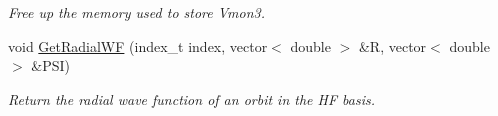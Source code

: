 \begin{DoxyCompactItemize}
\begin{DoxyCompactList}\small\item\em Free up the memory used to store Vmon3. \end{DoxyCompactList}\item 
void \hyperlink{classHartreeFock_a2bc07257af2fe0ca86e6a3f8c642c3c6}{Get\+Radial\+WF} (index\+\_\+t index, vector$<$ double $>$ \&R, vector$<$ double $>$ \&P\+SI)\hypertarget{classHartreeFock_a2bc07257af2fe0ca86e6a3f8c642c3c6}{}\label{classHartreeFock_a2bc07257af2fe0ca86e6a3f8c642c3c6}

\begin{DoxyCompactList}\small\item\em Return the radial wave function of an orbit in the HF basis. \end{DoxyCompactList}\end{DoxyCompactItemize}
